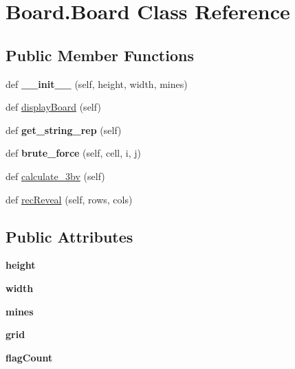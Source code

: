 \hypertarget{class_board_1_1_board}{}\section{Board.\+Board Class Reference}
\label{class_board_1_1_board}
\subsection*{Public Member Functions}
\begin{DoxyCompactItemize}
\item 
\mbox{\label{class_board_1_1_board_a64e3380089e1c6b86069eed8ef0a4cf9}} 
def {\bfseries \+\_\+\+\_\+init\+\_\+\+\_\+} (self, height, width, mines)
\item 
def \hyperlink{class_board_1_1_board_af52ea18259bf8d2a122de08fcb0ea308}{display\+Board} (self)
\item 
\mbox{\label{class_board_1_1_board_ac84e7c87ac2407614bf0e63f165a76d5}} 
def {\bfseries get\+\_\+string\+\_\+rep} (self)
\item 
\mbox{\label{class_board_1_1_board_a8b8e0d2e99c02de780604baa141159c3}} 
def {\bfseries brute\+\_\+force} (self, cell, i, j)
\item 
def \hyperlink{class_board_1_1_board_a9f3fd38d0abf01671f3d8bb0f3ceea5e}{calculate\+\_\+3bv} (self)
\item 
def \hyperlink{class_board_1_1_board_a4a027666af1fa52582af6543985a73c6}{rec\+Reveal} (self, rows, cols)
\end{DoxyCompactItemize}
\subsection*{Public Attributes}
\begin{DoxyCompactItemize}
\item 
\mbox{\label{class_board_1_1_board_a288daa852b69c17ecbabab9af6dac15a}} 
{\bfseries height}
\item 
\mbox{\label{class_board_1_1_board_a354a175ae1f399098ac23ed37c58a3f2}} 
{\bfseries width}
\item 
\mbox{\label{class_board_1_1_board_a46a8a14d245c71600c5416deab063feb}} 
{\bfseries mines}
\item 
\mbox{\label{class_board_1_1_board_a29136b70f21697be0dcccb782d5ee5bf}} 
{\bfseries grid}
\item 
\mbox{\label{class_board_1_1_board_a404b2ee0a7cec1fe76688e1da26e4339}} 
{\bfseries flag\+Count}
\end{DoxyCompactItemize}


